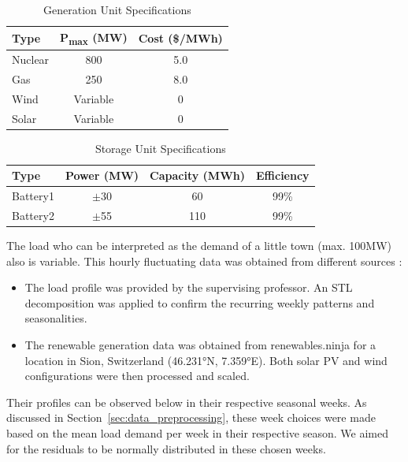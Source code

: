 \begin{table}[h]
\centering
\begin{tabular}{l|c|c}
\hline
Type & P\textsubscript{max} (MW) & Cost (\$/MWh) \\
\hline
Nuclear & 800 & 5.0  \\
Gas & 250 & 8.0  \\
Wind & Variable & 0  \\
Solar & Variable & 0  \\
\hline
\end{tabular}
\caption{Generation Unit Specifications}
\label{tab:gen_specs}
\end{table}

\begin{table}[h]
\centering
\begin{tabular}{l|c|c|c}
\hline
Type & Power (MW) & Capacity (MWh) & Efficiency \\
\hline
Battery1 & $\pm$30 & 60 & 99\% \\
Battery2 & $\pm$55 & 110 & 99\% \\
\hline
\end{tabular}
\caption{Storage Unit Specifications}
\label{tab:storage_specs}
\end{table}


The load who can be interpreted as the demand of a little town (max. 100MW) also is variable. This hourly
fluctuating data was obtained from different sources : 
\begin{itemize}
    \item The load profile was provided by the supervising professor. An STL decomposition was applied 
    to confirm the recurring weekly patterns and seasonalities.
    \item The renewable generation data was obtained 
    from renewables.ninja \cite{renewables_ninja} for a location in Sion, Switzerland (46.231°N, 7.359°E).
    Both solar PV and wind configurations were then processed and scaled.
\end{itemize}

Their profiles can be observed below in their respective seasonal weeks. As discussed in 
Section~\ref{sec:data_preprocessing}, these week choices were made based on the mean load demand per week in 
their respective season. We aimed for the residuals to be normally distributed in these chosen weeks.

